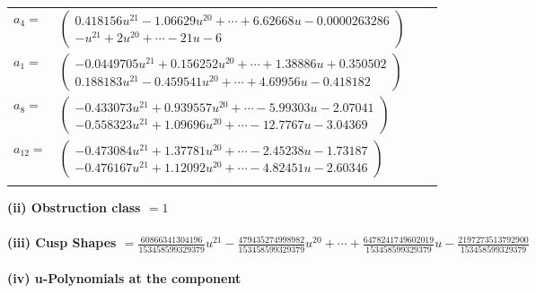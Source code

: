 \documentclass[1p]{elsarticle_modified}
\theoremstyle{definition}
\begin{document}
\begin{tabular}{m{7pt} m{180pt} m{7pt} m{180pt} }
\flushright $a_{4}=$&$\begin{pmatrix}0.418156 u^{21}-1.06629 u^{20}+\cdots+6.62668 u-0.0000263286\\- u^{21}+2 u^{20}+\cdots-21 u-6\end{pmatrix}$ \\
\flushright $a_{1}=$&$\begin{pmatrix}-0.0449705 u^{21}+0.156252 u^{20}+\cdots+1.38886 u+0.350502\\0.188183 u^{21}-0.459541 u^{20}+\cdots+4.69956 u-0.418182\end{pmatrix}$ \\
\flushright $a_{8}=$&$\begin{pmatrix}-0.433073 u^{21}+0.939557 u^{20}+\cdots-5.99303 u-2.07041\\-0.558323 u^{21}+1.09696 u^{20}+\cdots-12.7767 u-3.04369\end{pmatrix}$ \\
\flushright $a_{12}=$&$\begin{pmatrix}-0.473084 u^{21}+1.37781 u^{20}+\cdots-2.45238 u-1.73187\\-0.476167 u^{21}+1.12092 u^{20}+\cdots-4.82451 u-2.60346\end{pmatrix}$\\&\end{tabular}
\flushleft \textbf{(ii) Obstruction class $= 1$}\\~\\
\flushleft \textbf{(iii) Cusp Shapes $= \frac{60866341304196}{153458599329379} u^{21}-\frac{479435274998982}{153458599329379} u^{20}+\cdots+\frac{6478241749602019}{153458599329379} u-\frac{2197273513792900}{153458599329379}$}\\~\\
\newpage\renewcommand{\arraystretch}{1}
\flushleft \textbf{(iv) u-Polynomials at the component}\newline \\
\end{document}
